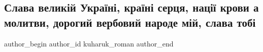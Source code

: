  
 
 
 
 
 
\subsection{Слава великій Україні, країні серця, нації крови а молитви, дорогий вербовий народе мій, слава тобі}
\label{sec:16_06_2021.fb.kuharuk_roman.1.slava_narodu}
\ifcmt
 author_begin
   author_id kuharuk_roman
 author_end
\fi


